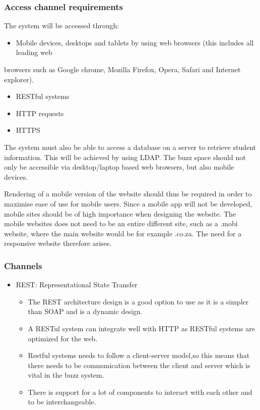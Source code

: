 \subsubsection{Access channel requirements}
The system will be accessed through:\
\begin{itemize}
			\item Mobile devices, desktops and tablets by using web browsers (this includes all leading web
\end{itemize}
 browsers such as Google chrome, Mozilla Firefox, Opera, Safari and Internet explorer).
 \begin{itemize}
			\item RESTful systems
			\item HTTP requests
			\item HTTPS
\end{itemize}

The system must also be able to access a database on a server to retrieve student information. This will be achieved by using LDAP.
The buzz space should not only be accessible via desktop/laptop based web browsers, but also mobile devices.

Rendering of a mobile version of the website should thus be required in order to maximise ease of use for mobile users. Since a mobile app will not be developed, mobile sites should be of high importance when designing the website. The mobile websites does not need to be an entire different site, such as a .mobi website, where the main website would be for example .co.za. The need for a responsive website therefore arises.


\subsubsection{Channels}
\begin{itemize}
\item REST: Representational State Transfer
\begin{itemize}
\item The REST architecture design is a good option to use as it is a simpler than SOAP and is a dynamic design.
\item A RESTul system can integrate well with HTTP as RESTful systems are optimized for the web.
\item Restful systems needs to follow a client-server model,so this means that there needs to be communication between the client and server which is vital in the buzz system.
\item There is support for a lot of components to interact with each other and to be interchangeable.
\end{itemize}
\end{itemize}
